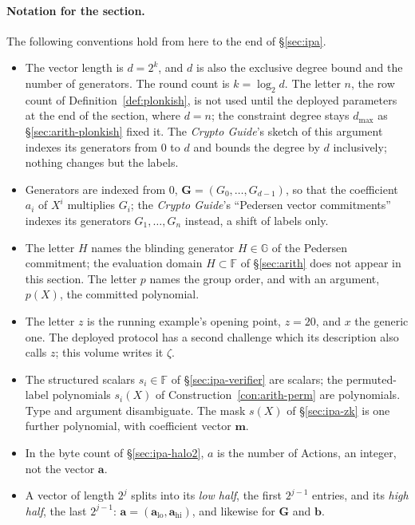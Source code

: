 \documentclass[11pt,a4paper]{article}
\theoremstyle{definition}
\newcommand{\F}{\mathbb{F}}
\newcommand{\G}{\mathbb{G}}
\begin{document}
\paragraph{Notation for the section.}
The following conventions hold from here to the end of
\S\ref{sec:ipa}.
\begin{itemize}[leftmargin=*, itemsep=1pt]
\item The vector length is $d = 2^k$, and $d$ is also the exclusive
  degree bound and the number of generators. The round count is
  $k = \log_2 d$. The letter $n$, the row count of
  Definition~\ref{def:plonkish}, is not used until the deployed
  parameters at the end of the section, where $d = n$; the constraint
  degree stays $d_{\max}$ as \S\ref{sec:arith-plonkish} fixed it. The
  \emph{Crypto Guide}'s sketch of this argument indexes its generators
  from $0$ to $d$ and bounds the degree by $d$ inclusively; nothing
  changes but the labels.
\item Generators are indexed from $0$, $\mathbf G = (G_0, \dots,
  G_{d-1})$, so that the coefficient $a_i$ of $X^i$ multiplies $G_i$; the
  \emph{Crypto Guide}'s ``Pedersen vector commitments'' indexes its
  generators $G_1, \dots, G_n$ instead, a shift of labels only.
\item The letter $H$ names the blinding generator $H \in \G$ of the
  Pedersen commitment; the evaluation domain $H \subset \F$ of
  \S\ref{sec:arith} does not appear in this section. The letter $p$
  names the group order, and with an argument, $p(X)$, the committed
  polynomial.
\item The letter $z$ is the running example's opening point, $z = 20$,
  and $x$ the generic one. The deployed protocol has a second challenge
  which its description also calls $z$; this volume writes it $\zeta$.
\item The structured scalars $s_i \in \F$ of \S\ref{sec:ipa-verifier}
  are scalars; the permuted-label polynomials $s_i(X)$ of
  Construction~\ref{con:arith-perm} are polynomials. Type and argument
  disambiguate. The mask $s(X)$ of \S\ref{sec:ipa-zk} is one further
  polynomial, with coefficient vector $\mathbf m$.
\item In the byte count of \S\ref{sec:ipa-halo2}, $a$ is the number of
  Actions, an integer, not the vector $\mathbf a$.
\item A vector of length $2^j$ splits into its \emph{low half}, the
  first $2^{j-1}$ entries, and its \emph{high half}, the last
  $2^{j-1}$: $\mathbf a = (\mathbf a_{\mathrm{lo}}, \mathbf a_{\mathrm{hi}})$,
  and likewise for $\mathbf G$ and $\mathbf b$.
\end{itemize}
\end{document}
